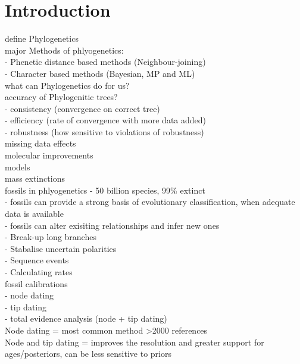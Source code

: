 \documentclass[a4paper,11pt]{article}
\begin{document}
\section{Introduction}

define Phylogenetics\\
major Methods of phlyogenetics:\\ 
 - Phenetic distance based methods (Neighbour-joining)\\
 - Character based methods (Bayesian, MP and ML)\\
what can Phylogenetics do for us?\\

accuracy of Phylogenitic trees?\\
 - consistency (convergence on correct tree)\\
 - efficiency (rate of convergence with more data added)\\
 - robustness (how sensitive to violations of robustness)\\

missing data effects\\

molecular improvements\\

models\\

mass extinctions\\

fossils in phlyogenetics - 50 billion species, 99\% extinct \\
 - fossils can provide a strong basis of evolutionary classification, when adequate data is available \\
 - fossils can alter exisiting relationships and infer new ones\\
 - Break-up long branches\\
 - Stabalise uncertain polarities\\
 - Sequence events\\
 - Calculating rates\\

fossil calibrations\\
- node dating\\
- tip dating \\
- total evidence analysis (node + tip dating)\\

Node dating = most common method >2000 references\\
Node and tip dating = improves the resolution and greater support for ages/posteriors, can be less sensitive to priors\\
\end{document}

